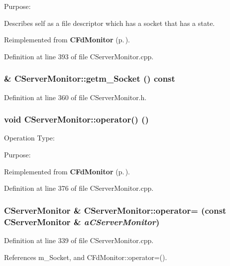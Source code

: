Purpose:

Describes self as a file descriptor which has a socket that has a state. 

Reimplemented from {\bf CFd\-Monitor} {\rm (p.\,\pageref{classCFdMonitor_a12})}.

Definition at line 393 of file CServer\-Monitor.cpp.
\subsubsection{\& CServer\-Monitor::getm\_\-Socket () const\hspace{0.3cm}{\tt  [inline]}}\label{classCServerMonitor_a6}




Definition at line 360 of file CServer\-Monitor.h.
\subsubsection{\setlength{\rightskip}{0pt plus 5cm}void CServer\-Monitor::operator() ()\hspace{0.3cm}{\tt  [virtual]}}\label{classCServerMonitor_a7}


Operation Type:

Purpose: 

Reimplemented from {\bf CFd\-Monitor} {\rm (p.\,\pageref{classCFdMonitor_a11})}.

Definition at line 376 of file CServer\-Monitor.cpp.
\subsubsection{\setlength{\rightskip}{0pt plus 5cm}CServer\-Monitor \& CServer\-Monitor::operator= (const CServer\-Monitor \& {\em a\-CServer\-Monitor})}\label{classCServerMonitor_a4}




Definition at line 339 of file CServer\-Monitor.cpp.

References m\_\-Socket, and CFd\-Monitor::operator=().
